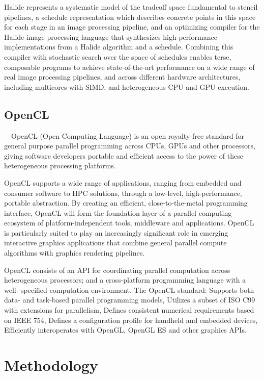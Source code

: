 \documentclass{sigplanconf}
\begin{document}
    Halide represents a systematic model of the tradeoff space fundamental to stencil pipelines, a schedule representation which describes concrete points in this space for each stage in an image processing pipeline, and an optimizing compiler for the Halide image processing language that synthesizes high performance implementations from a Halide algorithm and a schedule. Combining this compiler with stochastic search over the space of schedules enables terse, composable programs to achieve state-of-the-art performance on a wide range of real image processing pipelines, and across different hardware architectures, including multicores with SIMD, and heterogeneous CPU and GPU execution.

\subsection{OpenCL}
\quad\ \ OpenCL (Open Computing Language) is an open royalty-free standard for general purpose parallel programming across CPUs, GPUs and other processors, giving software developers portable and efficient access to the power of these heterogeneous processing platforms.

    OpenCL supports a wide range of applications, ranging from embedded and consumer software to HPC solutions, through a low-level, high-performance, portable abstraction. By creating an efficient, close-to-the-metal programming interface, OpenCL will form the foundation layer of a parallel computing ecosystem of platform-independent tools, middleware and applications. OpenCL is particularly suited to play an increasingly significant role in emerging interactive graphics applications that combine general parallel compute algorithms with graphics rendering pipelines.
    
    OpenCL consists of an API for coordinating parallel computation across heterogeneous processors; and a cross-platform programming language with a well- specified computation environment. The OpenCL standard: Supports both data- and task-based parallel programming models, Utilizes a subset of ISO C99 with extensions for parallelism, Defines consistent numerical requirements based on IEEE 754, Defines a configuration profile for handheld and embedded devices, Efficiently interoperates with OpenGL, OpenGL ES and other graphics APIs.

\section{Methodology}
\end{document}
